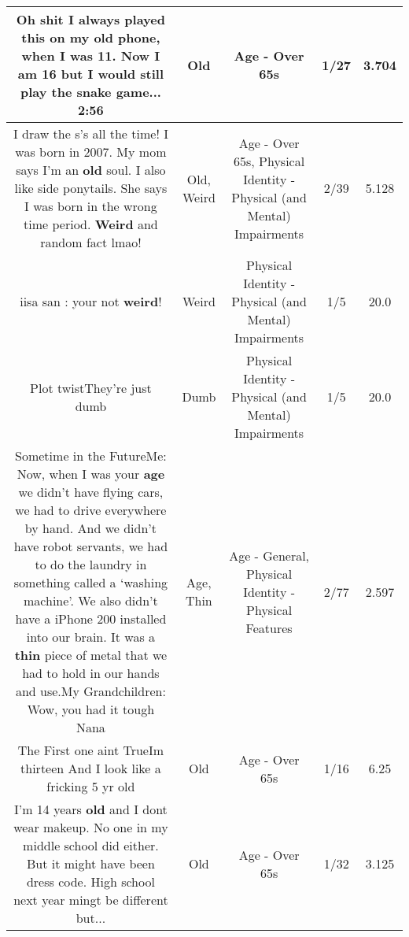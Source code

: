 \documentclass[11pt]{article}
\newlength\mylength
\begin{document}
\begin{center}
\begin{longtable}{|C{.65\mylength}|C{.30\mylength}|C{.12\mylength}|C{.12\mylength}|C{.12\mylength}|}
  \small Oh shit I always played this on my \textbf{old} phone, when I was 11. Now I am 16 but I would still play the snake game... 2:56\normalsize   & Old & Age - Over 65s & 1/27 & 3.704 \\  \hline
  \small I draw the s's all the time! I was born in 2007. My mom says I'm an \textbf{old} soul. I also like side ponytails. She says I was born in the wrong time period. \textbf{Weird} and random fact lmao!\normalsize   & Old, Weird & Age - Over 65s, Physical Identity - Physical (and Mental) Impairments & 2/39 & 5.128 \\  \hline
  \small \@ iisa san : your not \textbf{weird}!\normalsize   & Weird & Physical Identity - Physical (and Mental) Impairments & 1/5 & 20.0 \\  \hline
  \small Plot twistThey're just dumb\normalsize   & Dumb & Physical Identity - Physical (and Mental) Impairments & 1/5 & 20.0 \\  \hline
  \small Sometime in the FutureMe: Now, when I was your \textbf{age} we didn't have flying cars, we had to drive everywhere by hand. And we didn't have robot servants, we had to do the laundry in something called a ‘washing machine'. We also didn't have a iPhone 200 installed into our brain. It was a \textbf{thin} piece of metal that we had to hold in our hands and use.My Grandchildren: Wow, you had it tough Nana\normalsize   & Age, Thin & Age - General, Physical Identity - Physical Features & 2/77 & 2.597 \\  \hline
  \small The First one aint TrueIm thirteen And I look like a fricking 5 yr old\normalsize   & Old & Age - Over 65s & 1/16 & 6.25 \\  \hline
  \small I'm 14 years \textbf{old} and I dont wear makeup. No one in my middle school did either. But it might have been dress code. High school next year mingt be different but...\normalsize   & Old & Age - Over 65s & 1/32 & 3.125 \\  \hline

\end{longtable}
\end{center}
\end{document}
